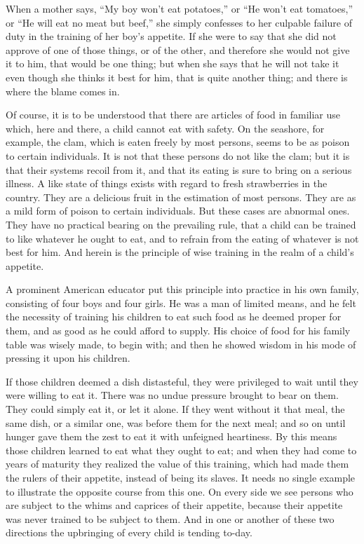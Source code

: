 \documentclass[
]{book}
\begin{document}
When a mother says, ``My boy won't eat potatoes,'' or ``He won't eat tomatoes,'' or ``He will eat no meat but beef,'' she simply confesses to her culpable failure of duty in the training of her boy's appetite. If she were to say that she did not approve of one of those things, or of the other, and therefore she would not give it to him, that would be one thing; but when she says that he will not take it even though she thinks it best for him, that is quite another thing; and there is where the blame comes in.

Of course, it is to be understood that there are articles of food in familiar use which, here and there, a child cannot eat with safety. On the seashore, for example, the clam, which is eaten freely by most persons, seems to be as poison to certain individuals. It is not that these persons do not like the clam; but it is that their systems recoil from it, and that its eating is sure to bring on a serious illness. A like state of things exists with regard to fresh strawberries in the country. They are a delicious fruit in the estimation of most persons. They are as a mild form of poison to certain individuals. But these cases are abnormal ones. They have no practical bearing on the prevailing rule, that a child can be trained to like whatever he ought to eat, and to refrain from the eating of whatever is not best for him. And herein is the principle of wise training in the realm of a child's appetite.

A prominent American educator put this principle into practice in his own family, consisting of four boys and four girls. He was a man of limited means, and he felt the necessity of training his children to eat such food as he deemed proper for them, and as good as he could afford to supply. His choice of food for his family table was wisely made, to begin with; and then he showed wisdom in his mode of pressing it upon his children.

If those children deemed a dish distasteful, they were privileged to wait until they were willing to eat it. There was no undue pressure brought to bear on them. They could simply eat it, or let it alone. If they went without it that meal, the same dish, or a similar one, was before them for the next meal; and so on until hunger gave them the zest to eat it with unfeigned heartiness. By this means those children learned to eat what they ought to eat; and when they had come to years of maturity they realized the value of this training, which had made them the rulers of their appetite, instead of being its slaves. It needs no single example to illustrate the opposite course from this one. On every side we see persons who are subject to the whims and caprices of their appetite, because their appetite was never trained to be subject to them. And in one or another of these two directions the upbringing of every child is tending to-day.
\end{document}
